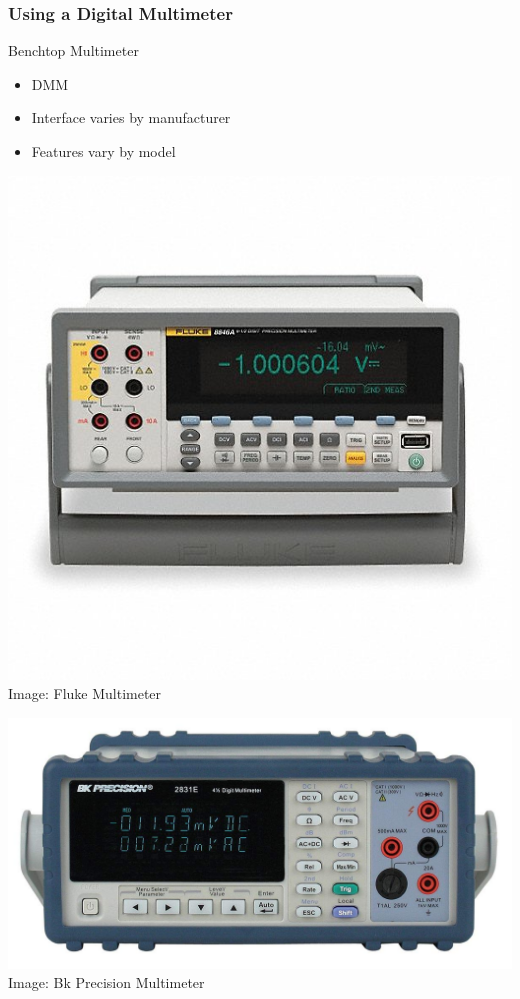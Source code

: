 \documentclass[fleqn]{beamer} %
\newcommand{\sectionIsubsectionIItitle}{Using a Digital Multimeter}
\begin{document}
			\begin{frame}
				\frametitle{\sectionIsubsectionIItitle}

				Benchtop Multimeter
			 
				\begin{itemize}
					\item DMM 
					\item Interface varies by manufacturer
					\item Features vary by model
				\end{itemize} 
				
				\begin{multicols}{2}
				
					\vspace{5mm}
					\includegraphics[scale=.25]{images/dmm_benchtop.jpeg}
					\tiny{Image: Fluke Multimeter}	 
					\vspace{50mm}

					\includegraphics[scale=.13]{images/bk_2831e.jpg}
					\vspace{10mm}
					\tiny{Image: Bk Precision Multimeter }	
					\vspace{10mm}

				\end{multicols}	

			\end{frame}
\end{document}
